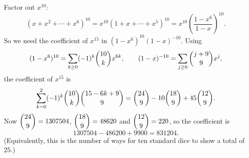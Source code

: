 Factor out $x^{10}$:
\[\left(x+x^2+\cdots+x^6\right)^{10}=x^{10}\left(1+x+\cdots+x^5\right)^{10}=x^{10}\left(\dfrac{1-x^6}{1-x}\right)^{10}.\]
So we need the coefficient of $x^{15}$ in $(1-x^6)^{10}(1-x)^{-10}$. Using
\[(1-x^6)^{10}=\sum_{k\ge0}(-1)^k\dbinom{10}{k}x^{6k},\qquad (1-x)^{-10}=\sum_{j\ge0}\dbinom{j+9}{9}x^j,\]
the coefficient of $x^{15}$ is
\[\sum_{k=0}^{2}(-1)^k\dbinom{10}{k}\dbinom{15-6k+9}{9}=\dbinom{24}{9}-10\dbinom{18}{9}+45\dbinom{12}{9}.\]
Now $\dbinom{24}{9}=1307504$, $\dbinom{18}{9}=48620$ and $\dbinom{12}{9}=220$, so the coefficient is
\[1307504-486200+9900=\boxed{831204}.\]
(Equivalently, this is the number of ways for ten standard dice to show a total of $25$.)
